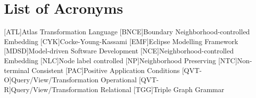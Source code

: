 \chapter*{List of Acronyms}
\begin{acronym}[MDSD]
	[ATL]{Atlas Transformation Language}
	[BNCE]{Boundary Neighborhood-controlled Embedding}
	[CYK]{Cocke-Young-Kassami}
	[EMF]{Eclipse Modelling Framework}
	[MDSD]{Model-driven Software Development}
	[NCE]{Neighborhood-controlled Embedding}
	[NLC]{Node label controlled}
	[NP]{Neighborhood Preserving}
	[NTC]{Non-terminal Consistent}
	[PAC]{Positive Application Conditions}
	[QVT-O]{Query/View/Transformation Operational}
	[QVT-R]{Query/View/Transformation Relational}
	[TGG]{Triple Graph Grammar}
\end{acronym}